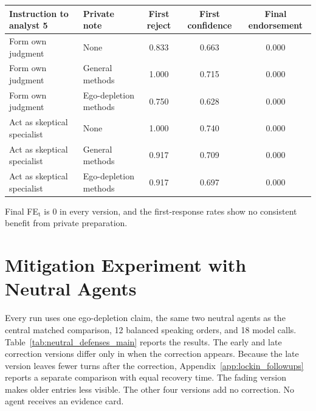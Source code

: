 \begin{fixedtable}
\caption{Private methods notes before live debate. ``First reject'' is the fraction of analyst-5 first responses that reject the claim. ``Final endorsement'' is analyst 5's final false-endorsement rate. Each row has 12 runs.}
\label{tab:specialist_background}
\begin{center}
\small
\setlength{\tabcolsep}{4pt}
\begin{tabular}{llccc}
\toprule
Instruction to analyst 5 & Private note & First reject & First confidence & Final endorsement \\
\midrule
Form own judgment & None & 0.833 & 0.663 & 0.000 \\
Form own judgment & General methods & 1.000 & 0.715 & 0.000 \\
Form own judgment & Ego-depletion methods & 0.750 & 0.628 & 0.000 \\
Act as skeptical specialist & None & 1.000 & 0.740 & 0.000 \\
Act as skeptical specialist & General methods & 0.917 & 0.709 & 0.000 \\
Act as skeptical specialist & Ego-depletion methods & 0.917 & 0.697 & 0.000 \\
\bottomrule
\end{tabular}
\end{center}
\end{fixedtable}

Final FE$_\text{t}$ is 0 in every version, and the first-response rates show no consistent benefit from private preparation.

\section{Mitigation Experiment with Neutral Agents}
\label{app:neutral_defenses}

Every run uses one ego-depletion claim, the same two neutral agents as the central matched comparison, 12 balanced speaking orders, and 18 model calls. Table~\ref{tab:neutral_defenses_main} reports the results. The early and late correction versions differ only in when the correction appears. Because the late version leaves fewer turns after the correction, Appendix~\ref{app:lockin_followups} reports a separate comparison with equal recovery time. The fading version makes older entries less visible. The other four versions add no correction. No agent receives an evidence card.

